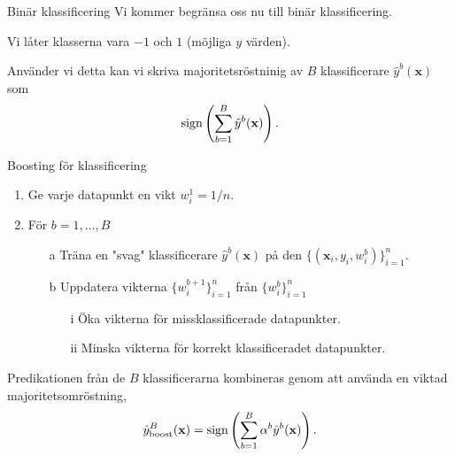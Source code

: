 \documentclass[10pt,english]{beamer}
\begin{document}
\begin{frame}{Binär klassificering}
    Vi kommer begränsa oss nu till binär klassificering.

    Vi låter klasserna vara $-1$ och $1$ (möjliga $y$ värden).

    Använder vi detta kan vi skriva majoritetsröstninig av $B$ klassificerare $\hat{y}^{b}(\mathbf{x})$ som
    \begin{equation*}
        \operatorname*{sign} \left(\sum_{b=1}^{B} \hat{y}^{b}(\mathbf{x})\right).
    \end{equation*}
\end{frame}

\begin{frame}{Boosting för klassificering}
    
    \begin{enumerate}
        \item Ge varje datapunkt en vikt $w_i^1 = 1/n$.
        \item För $b = 1, \ldots, B$
        \begin{enumerate}
            \item[a] Träna en "svag" klassificerare $\hat{y}^{b}(\mathbf{x})$ på den  $\{(\mathbf{x}_i,y_i,w_i^b)\}_{i=1}^{n}$.
            \item[b] Uppdatera vikterna $\{w_{i}^{b+1}\}_{i=1}^{n}$ från $\{w_{i}^{b}\}_{i=1}^{n}$
            \begin{enumerate}
                \item[i] Öka vikterna för missklassificerade datapunkter.
                \item[ii] Minska vikterna för korrekt klassificeradet datapunkter. 
            \end{enumerate}
        \end{enumerate}
    \end{enumerate}

    Predikationen från de $B$ klassificerarna kombineras genom att använda en viktad majoritetsomröstning,
    \begin{equation*}
        \hat{y}^{B}_{\text{boost}}(\mathbf{x}) = \operatorname*{sign} \left(\sum_{b=1}^{B} \alpha^b \hat{y}^b(\mathbf{x})\right).
    \end{equation*}

\end{frame}
\end{document}

